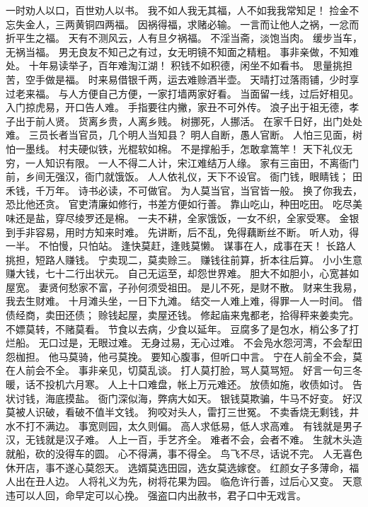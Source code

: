 \documentclass[12pt,UTF8]{ctexbook}
\begin{document}
一时劝人以口，百世劝人以书。
我不如人我无其福，人不如我我常知足！
捡金不忘失金人，三两黄铜四两福。
因祸得福，求赌必输。
一言而让他人之祸，一忿而折平生之福。
天有不测风云，人有旦夕祸福。
不淫当斋，淡饱当肉。
缓步当车，无祸当福。
男无良友不知己之有过，女无明镜不知面之精粗。
事非亲做，不知难处。
十年易读举子，百年难淘江湖！
积钱不如积德，闲坐不如看书。
思量挑担苦，空手做是福。
时来易借银千两，运去难赊酒半壶。
天晴打过落雨铺，少时享过老来福。
与人方便自己方便，一家打墙两家好看。
当面留一线，过后好相见。
入门掠虎易，开口告人难。
手指要往内撇，家丑不可外传。
浪子出于祖无德，孝子出于前人贤。
货离乡贵，人离乡贱。
树挪死，人挪活。
在家千日好，出门处处难。
三员长者当官员，几个明人当知县？
明人自断，愚人官断。
人怕三见面，树怕一墨线。
村夫硬似铁，光棍软如棉。
不是撑船手，怎敢拿篙竿！
天下礼仪无穷，一人知识有限。
一人不得二人计，宋江难结万人缘。
家有三亩田，不离衙门前，乡间无强汉，衙门就饿饭。
人人依礼仪，天下不设官。
衙门钱，眼睛钱；
田禾钱，千万年。
诗书必读，不可做官。
为人莫当官，当官皆一般。
换了你我去，恐比他还贪。
官吏清廉如修行，书差方便如行善。
靠山吃山，种田吃田。
吃尽美味还是盐，穿尽绫罗还是棉。
一夫不耕，全家饿饭，一女不织，全家受寒。
金银到手非容易，用时方知来时难。
先讲断，后不乱，免得藕断丝不断。
听人劝，得一半。
不怕慢，只怕站。
逢快莫赶，逢贱莫懒。
谋事在人，成事在天！
长路人挑担，短路人赚钱。
宁卖现二，莫卖赊三。
赚钱往前算，折本往后算。
小小生意赚大钱，七十二行出状元。
自己无运至，却怨世界难。
胆大不如胆小，心宽甚如屋宽。
妻贤何愁家不富，子孙何须受祖田。
是儿不死，是财不散。
财来生我易，我去生财难。
十月滩头坐，一日下九滩。
结交一人难上难，得罪一人一时间。
借债经商，卖田还债；
赊钱起屋，卖屋还钱。
修起庙来鬼都老，拾得秤来姜卖完。
不嫖莫转，不赌莫看。
节食以去病，少食以延年。
豆腐多了是包水，梢公多了打烂船。
无口过是，无眼过难。
无身过易，无心过难。
不会凫水怨河湾，不会犁田怨枷担。
他马莫骑，他弓莫挽。
要知心腹事，但听口中言。
宁在人前全不会，莫在人前会不全。
事非亲见，切莫乱谈。
打人莫打脸，骂人莫骂短。
好言一句三冬暖，话不投机六月寒。
人上十口难盘，帐上万元难还。
放债如施，收债如讨。
告状讨钱，海底摸盐。
衙门深似海，弊病大如天。
银钱莫欺骗，牛马不好变。
好汉莫被人识破，看破不值半文钱。
狗咬对头人，雷打三世冤。
不卖香烧无剩钱，井水不打不满边。
事宽则园，太久则偏。
高人求低易，低人求高难。
有钱就是男子汉，无钱就是汉子难。
人上一百，手艺齐全。
难者不会，会者不难。
生就木头造就船，砍的没得车的圆。
心不得满，事不得全。
鸟飞不尽，话说不完。
人无喜色休开店，事不遂心莫怨天。
选婿莫选田园，选女莫选嫁奁。
红颜女子多薄命，福人出在丑人边。
人将礼义为先，树将花果为园。
临危许行善，过后心又变。
天意违可以人回，命早定可以心挽。
强盗口内出赦书，君子口中无戏言。
\end{document}
